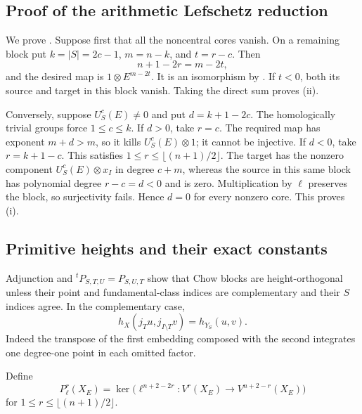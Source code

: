\subsection{Proof of the arithmetic Lefschetz reduction}
\label{sec:lefschetz-proof}

We prove . Suppose first that all the
noncentral cores vanish. On a remaining block put \(k=|S|=2c-1\),
\(m=n-k\), and \(t=r-c\). Then
\[
 n+1-2r=m-2t,
\]
and the desired map is
\(1\otimes E^{m-2t}\). It is an isomorphism by
. If \(t<0\), both its source and target
in this block vanish. Taking the direct sum proves (ii).

Conversely, suppose \(U_S^c(E)\ne0\) and put
\(d=k+1-2c\). The homologically trivial groups force
\(1\le c\le k\). If \(d>0\), take \(r=c\). The required
map has exponent \(m+d>m\), so it kills
\(U_S^c(E)\otimes1\); it cannot be injective. If \(d<0\),
take \(r=k+1-c\). This satisfies
\(1\le r\le\lfloor(n+1)/2\rfloor\). The target has the
nonzero component \(U_S^c(E)\otimes x_I\) in degree \(c+m\),
whereas the source in this same block has polynomial degree
\(r-c=d<0\) and is zero. Multiplication by \(\ell\) preserves
the block, so surjectivity fails. Hence \(d=0\) for every nonzero
core. This proves (i).

\subsection{Primitive heights and their exact constants}
\label{sec:primitive-proof}

Adjunction and \({}^tP_{S,T,U}=P_{S,U,T}\) show that Chow blocks
are height-orthogonal unless their point and fundamental-class
indices are complementary and their \(S\) indices agree. In the
complementary case,
\begin{equation}\label{eq:complement-height}
 h_X(j_Tu,j_{I\setminus T}v)=h_{Y_S}(u,v).
\end{equation}
Indeed the transpose of the first embedding composed with the
second integrates one degree-one point in each omitted factor.

Define
\[
 P_\ell^r(X_E)=\ker\bigl(
   \ell^{n+2-2r}:V^r(X_E)\to V^{n+2-r}(X_E)\bigr)
\]
for \(1\le r\le\lfloor(n+1)/2\rfloor\).


